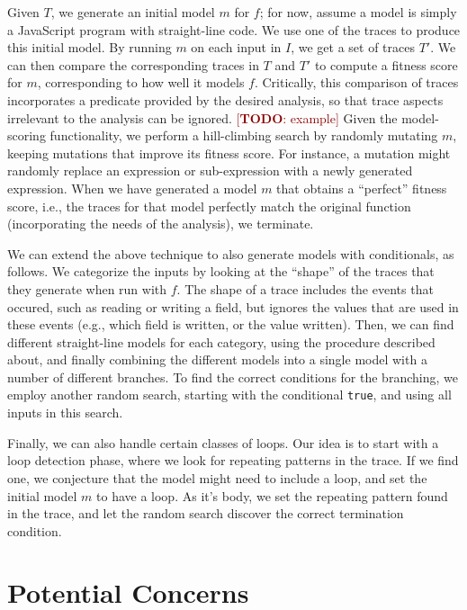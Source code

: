 \documentclass[]{article}
\newcommand{\code}[1]{\lstinline{#1}}
\newcommand{\todo}[1]{{\textcolor{DarkRed}{ [\textbf{TODO}: #1]}}}
\begin{document}
Given $T$, we generate an initial model $m$ for $f$; for now, assume a model
is simply
a JavaScript program with straight-line code.
We use one of the traces to produce this initial model.
By running $m$ on each input in $I$,
we get a set of traces $T'$.  We can then compare the corresponding traces in $T$
and $T'$ to compute a fitness score for $m$, corresponding to how well it models $f$.
Critically, this comparison of traces incorporates a predicate provided by the
desired analysis, so that trace aspects irrelevant to the analysis can be
ignored.  \todo{example}
Given the model-scoring functionality, we perform a
hill-climbing search by randomly mutating $m$, keeping mutations that improve its
fitness score.   For instance, a mutation might randomly replace an expression
or sub-expression with a newly generated expression.
When we have generated a
model $m$ that obtains a ``perfect'' fitness score, i.e., the traces for that
model perfectly match the original function (incorporating the needs of the
analysis), we terminate.

We can extend the above technique to also generate models with conditionals, as
follows.  We categorize the inputs by looking at the ``shape'' of the traces
that they generate when run with $f$.  The shape of a trace includes the events
that occured, such as reading or writing a field, but ignores the values that
are used in these events (e.g., which field is written, or the value written).
Then, we can find different straight-line models for each category, using
the procedure described about, and finally combining the different models
into a single model with a number of different branches.
To find the correct conditions for the branching, we employ another random
search, starting with the conditional \code{true}, and using all inputs
in this search.

Finally, we can also handle certain classes of loops.  Our idea is to start
with a loop detection phase, where we look for repeating patterns in the
trace.  If we find one, we conjecture that the model might need to include a
loop, and set the initial model $m$ to have a loop.  As it's body, we
set the repeating pattern found in the trace, and let the random search
discover the correct termination condition.



\section*{Potential Concerns}
\end{document}
